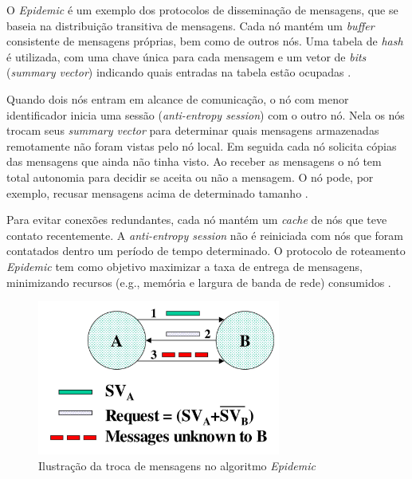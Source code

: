 \documentclass[mestrado, pre-defesa, english, brazil]{packages/icmc}
\begin{document}

O \textit{Epidemic} é um exemplo dos protocolos de disseminação de mensagens, que se baseia na distribuição transitiva de mensagens. Cada nó mantém um \textit{buffer} consistente de mensagens próprias, bem como de outros nós. Uma tabela de \textit{hash} é utilizada, com uma chave única para cada mensagem e um vetor de \textit{bits} (\textit{summary vector}) indicando quais entradas na tabela estão ocupadas \cite{Vahdat-2000,oliveira-2010}. 

Quando dois nós entram em alcance de comunicação, o nó com menor identificador inicia uma sessão (\textit{anti-entropy session}) com o outro nó. Nela os nós trocam seus \textit{summary vector} para determinar quais mensagens armazenadas remotamente não foram vistas pelo nó local. Em seguida cada nó solicita cópias das mensagens que ainda não tinha visto. Ao receber as mensagens o nó tem total autonomia para decidir se aceita ou não a mensagem. O nó pode, por exemplo, recusar mensagens acima de determinado tamanho \cite{Vahdat-2000}.

Para evitar conexões redundantes, cada nó mantém um \textit{cache} de nós que teve contato recentemente. A \textit{anti-entropy session} não é reiniciada com nós que foram contatados dentro um período de tempo determinado. O protocolo de roteamento \textit{Epidemic} tem como objetivo maximizar a taxa de entrega de mensagens, minimizando recursos (e.g., memória e largura de banda de rede) consumidos \cite{Vahdat-2000,oliveira-2010}.

\begin{figure}[!htbp]
    \centering
    \caption{\label{fig:epidemic} Ilustração da troca de mensagens no algoritmo \emph{Epidemic}}
    \includegraphics[width=8cm]{img/epidemic.jpeg}
\end{figure}
\end{document}

